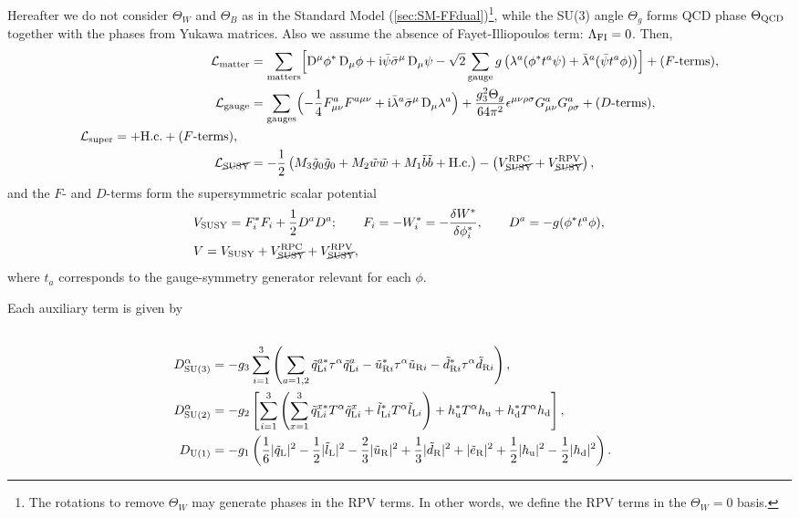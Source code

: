 \documentclass[CheatSheet]{subfiles}
\begin{document}
Hereafter we do not consider $\Theta_W$ and $\Theta_B$ as in the Standard Model (\cref{sec:SM-FFdual})\footnote{The rotations to remove $\Theta_W$ may generate phases in the RPV terms. In other words, we define the RPV terms in the $\Theta_W=0$ basis.}, while the SU(3) angle $\Theta_g$ forms QCD phase $\Theta_{\mathrm{QCD}}$ together with the phases from Yukawa matrices.
Also we assume the absence of Fayet-Illiopoulos term: $\Lambda_{\mathrm{FI}}=0$.
Then,
\begin{align}
 \mathcal L\w{matter} &= \sum\w{matters}\Bigl[\DD^\mu\phi^*\DD_\mu\phi+\ii\bpsi\bsigma^\mu\DD_\mu\psi
- \sqrt2\sum\w{gauge} g\left(\lambda^a(\phi^*t^a\psi)+\blambda^a(\bpsi t^a\phi)\right)
\Bigr] + \text{($F$-terms)},\\
 \mathcal L\w{gauge} &= \sum\w{gauges}\Bigl(-\frac14F^a_{\mu\nu}F^{a\mu\nu}+\ii\blambda^a\bsigma^\mu\DD_\mu\lambda^a\Bigr) + \frac{g_3^2\Theta_g}{64\pi^2}\epsilon^{\mu\nu\rho\sigma}G^a_{\mu\nu}G^a_{\rho\sigma}+ \text{($D$-terms)},
\\
\begin{split}
  \mathcal L\w{super} &=
   
+ \text{H.c.} +\text{($F$-terms)},
\end{split}\\
\mathcal L_{\text{\cancel{SUSY}}}
&=
- \frac12\left(M_3\tig_0\tig_0+M_2\tiw\tiw+M_1\tib\tib+\text{H.c.}\right)
-
\left(
V^{\mathrm{RPC}}_{\text{\cancel{SUSY}}}
+V^{\mathrm{RPV}}_{\text{\cancel{SUSY}}}\right),
\end{align}
and the $F$- and $D$-terms form the supersymmetric scalar potential
\begin{align}
& V_{\mathrm{SUSY}} = F^{*}_i F_i+\frac12 D^aD^a;
\qquad
 F_i = -W_i^* = -\frac{\delta W^*}{\delta \phi_i^*},
\qquad
 D^a = -g(\phi^* t^a \phi),
\\
&V=V_{\mathrm{SUSY}} +
V^{\mathrm{RPC}}_{\text{\cancel{SUSY}}}
+V^{\mathrm{RPV}}_{\text{\cancel{SUSY}}},
\end{align}
where $t_a$ corresponds to the gauge-symmetry generator relevant for each $\phi$.

Each auxiliary term is given by
\begin{align}

\\
D\w{SU(3)}^\alpha &= -g_3\sum_{i=1}^3\left(
 \sum_{a=1,2}
  \tqL[i]^{a*} \tau^\alpha \tqL[i]^{a}
- \tuR[i]^{*} \tau^\alpha \tuR[i]
- \tdR[i]^{*} \tau^\alpha \tdR[i]
\right),\\
%
D\w{SU(2)}^\alpha &= -g_2\left[
   \sum_{i=1}^3\left(
  \sum_{x=1}^3 \tqL[i]^{x*}T^\alpha\tqL[i]^{x}
+              \tlL[i]^{*}T^\alpha \tlL[i]
  \right)
+ \hu^*T^\alpha\hu
+ \hd^*T^\alpha\hd
\right],\\
%
 D\w{U(1)} &= -g_1\left(
  \frac16|\tqL|^2
- \frac12|\tlL|^2
- \frac23|\tuR|^2
+ \frac13|\tdR|^2
+        |\teR|^2
+ \frac12|\hu|^2
- \frac12|\hd|^2
\right).
\end{align}
\end{document}
